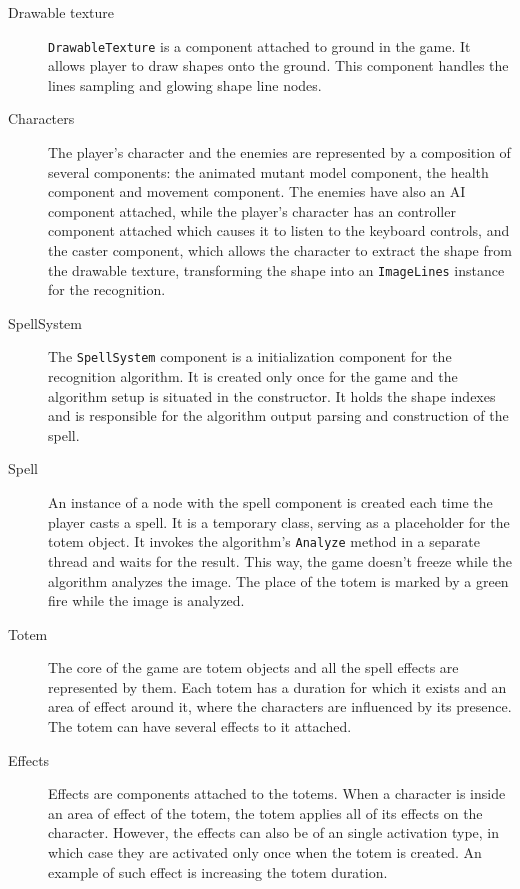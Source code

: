 \begin{description}
\begin{description}
\begin{description}
\item [Drawable texture] \texttt{DrawableTexture} is a component attached to ground in the game. It allows player to draw shapes onto the ground. This component handles the lines sampling and glowing shape line nodes.

\item [Characters] The player's character and the enemies are represented by a composition of several components: the animated mutant model component, the health component and movement component. The enemies have also an AI component attached, while the player's character has an controller component attached which causes it to listen to the keyboard controls, and the caster component, which allows the character to extract the shape from the drawable texture, transforming the shape into an \texttt{ImageLines} instance for the recognition.

\item [SpellSystem] The \texttt{SpellSystem} component is a initialization component for the recognition algorithm. It is created only once for the game and the algorithm setup is situated in the constructor. It holds the shape indexes and is responsible for the algorithm output parsing and construction of the spell.

\item [Spell] An instance of a node with the spell component is created each time the player casts a spell. It is a temporary class, serving as a placeholder for the totem object. It invokes the algorithm's \texttt{Analyze} method in a separate thread and waits for the result. This way, the game doesn't freeze while the algorithm analyzes the image. The place of the totem is marked by a green fire while the image is analyzed. 

\item [Totem] The core of the game are totem objects and all the spell effects are represented by them. Each totem has a duration for which it exists and an area of effect around it, where the characters are influenced by its presence. The totem can have several effects to it attached.

\item [Effects]  Effects are components attached to the totems. When a character is inside an area of effect of the totem, the totem applies all of its effects on the character. However, the effects can also be of an single activation type, in which case they are activated only once when the totem is created. An example of such effect is increasing the totem duration.


\end{description}
\end{description}
\end{description}

